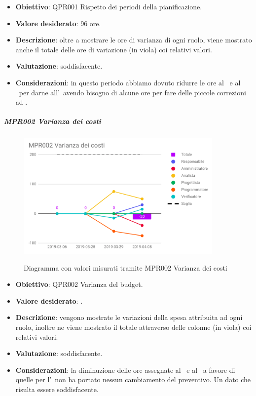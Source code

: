	\begin{itemize}
		\item \textbf{Obiettivo}: QPR001 Rispetto dei periodi della pianificazione.
		\item \textbf{Valore desiderato}: 96 ore.
		\item \textbf{Descrizione}: oltre a mostrare le ore di varianza di ogni ruolo, viene mostrato anche il totale delle ore di variazione (in viola) coi relativi valori.
		\item \textbf{Valutazione}: soddisfacente.
		\item \textbf{Considerazioni}: in questo periodo abbiamo dovuto ridurre le ore al
		\Progr\ e al \Ver\ per darne all'\Ana\ avendo bisogno di alcune ore per fare delle piccole correzioni
		ad \AdRv.
	\end{itemize}

		\subparagraph{MPR002 Varianza dei costi}
	
	\begin{figure}[H]
		\centering
		\includegraphics[width=0.9\textwidth]{img/cruscotti/RQ/MPR002.png}
		\label{immagineVarianzaCostiRQ}
		\caption{Diagramma con valori misurati tramite MPR002 Varianza dei costi}
	\end{figure}
	
	\begin{itemize}
		\item \textbf{Obiettivo}: QPR002 Varianza del budget.
		\item \textbf{Valore desiderato}: .
		\item \textbf{Descrizione}: vengono mostrate le variazioni della spesa attribuita ad ogni ruolo, inoltre ne viene mostrato il totale attraverso delle colonne (in viola) coi relativi valori.
		\item \textbf{Valutazione}: soddisfacente.
		\item \textbf{Considerazioni}: la diminuzione delle ore assegnate al \Progr\ e al \Ver\ a favore di quelle per l'\Ana\, non ha portato nessun cambiamento del preventivo. Un dato che
		risulta essere soddisfacente.
	\end{itemize}

